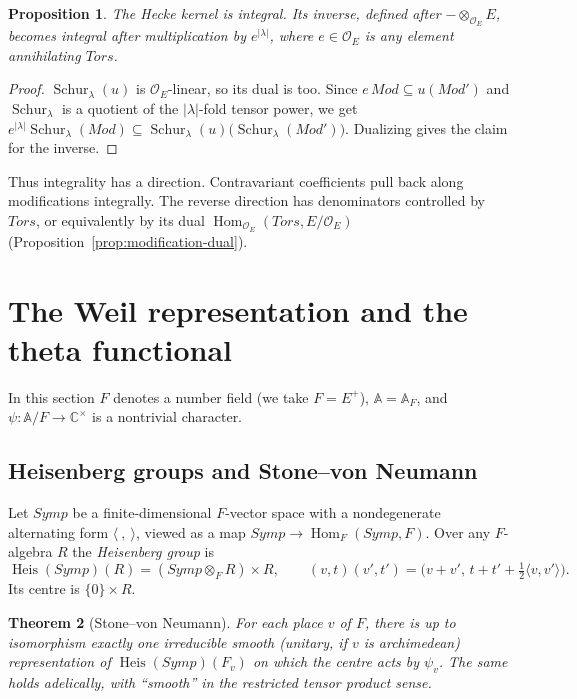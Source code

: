 \documentclass[11pt]{amsart}
\newtheorem{theorem}{Theorem}[section]
\newtheorem{proposition}[theorem]{Proposition}
\theoremstyle{definition}
\theoremstyle{remark}
\newcommand{\OEring}{\mathcal{O}_E}
\newcommand{\Md}{\mathit{Mod}}
\newcommand{\Tors}{\mathit{Tors}}
\newcommand{\Symp}{\mathit{Symp}}
\DeclareMathOperator{\Hom}{Hom}
\DeclareMathOperator{\Schur}{Schur}
\DeclareMathOperator{\Heis}{Heis}
\newcommand{\A}{\mathbb{A}}
\newcommand{\C}{\mathbb{C}}
\begin{document}
\begin{proposition}\label{prop:hecke-integral}
The Hecke kernel is integral. Its inverse, defined after $-\otimes_{\OEring}E$, becomes integral after multiplication by $e^{|\lambda|}$, where $e\in\OEring$ is any element annihilating $\Tors$.
\end{proposition}

\begin{proof}
$\Schur_\lambda(u)$ is $\OEring$-linear, so its dual is too. Since $e\,\Md\subseteq u(\Md')$ and $\Schur_\lambda$ is a quotient of the $|\lambda|$-fold tensor power, we get $e^{|\lambda|}\Schur_\lambda(\Md)\subseteq\Schur_\lambda(u)\bigl(\Schur_\lambda(\Md')\bigr)$. Dualizing gives the claim for the inverse.
\end{proof}

Thus integrality has a direction. Contravariant coefficients pull back along modifications integrally. The reverse direction has denominators controlled by $\Tors$, or equivalently by its dual $\Hom_{\OEring}(\Tors,E/\OEring)$ (Proposition~\ref{prop:modification-dual}).

\section{The Weil representation and the theta functional}\label{sec:weil}

In this section $F$ denotes a number field (we take $F=E^+$), $\A=\A_F$, and $\psi\colon\A/F\to\C^\times$ is a nontrivial character.

\subsection{Heisenberg groups and Stone--von Neumann}
Let $\Symp$ be a finite-dimensional $F$-vector space with a nondegenerate alternating form $\langle\ ,\ \rangle$, viewed as a map $\Symp\to\Hom_F(\Symp,F)$. Over any $F$-algebra $R$ the \emph{Heisenberg group} is
\[
\Heis(\Symp)(R)=(\Symp\otimes_F R)\times R,\qquad
(v,t)(v',t')=\bigl(v+v',\,t+t'+\tfrac12\langle v,v'\rangle\bigr).
\]
Its centre is $\{0\}\times R$.

\begin{theorem}[Stone--von Neumann]\label{thm:svn}
For each place $v$ of $F$, there is up to isomorphism exactly one irreducible smooth (unitary, if $v$ is archimedean) representation of $\Heis(\Symp)(F_v)$ on which the centre acts by $\psi_v$. The same holds adelically, with ``smooth'' in the restricted tensor product sense.
\end{theorem}
\end{document}
